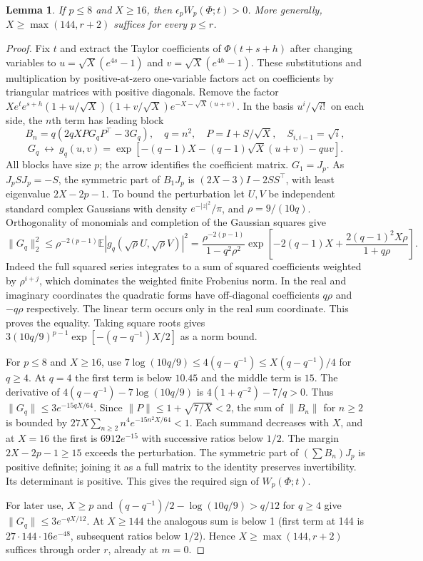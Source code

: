 \documentclass[11pt,a4paper,reqno]{amsart}
\newtheorem{lemma}[theorem]{Lemma}
\numberwithin{equation}{section}
\begin{document}
\begin{lemma}\label{lem:tail}
If \(p\le8\) and \(X\ge16\), then \(\epsilon_p W_p(\Phi;t)>0\). More generally, \(X\ge\max(144,r+2)\) suffices for every \(p\le r\).
\end{lemma}


\begin{proof}
Fix \(t\) and extract the Taylor coefficients of \(\Phi(t+s+h)\) after changing variables to \(u=\sqrt X(e^{4s}-1)\) and \(v=\sqrt X(e^{4h}-1)\). These substitutions and multiplication by positive-at-zero one-variable factors act on coefficients by triangular matrices with positive diagonals. Remove the factor \(Xe^te^{s+h}(1+u/\sqrt X)(1+v/\sqrt X)e^{-X-\sqrt X(u+v)}\). In the basis \(u^i/\sqrt{i!}\) on each side, the \(n\)th term has leading block \[B_n=q(2qX PG_qP^\top-3G_q),\quad q=n^2,\quad P=I+S/\sqrt X,\quad S_{i,i-1}=\sqrt i,\] \[G_q\ \longleftrightarrow\ g_q(u,v)=\exp[-(q-1)X-(q-1)\sqrt X(u+v)-quv].\] All blocks have size \(p\); the arrow identifies the coefficient matrix. \(G_1=J_p\). As \(J_p S J_p=-S\), the symmetric part of \(B_1J_p\) is \((2X-3)I-2SS^\top\), with least eigenvalue \(2X-2p-1\). To bound the perturbation let \(U,V\) be independent standard complex Gaussians with density \(e^{-|z|^2}/\pi\), and \(\rho=9/(10q)\). Orthogonality of monomials and completion of the Gaussian squares give \[\|G_q\|_2^2\le \rho^{-2(p-1)}\mathbb E|g_q(\sqrt\rho U,\sqrt\rho V)|^2
 =\frac{\rho^{-2(p-1)}}{1-q^2\rho^2}
  \exp\left[-2(q-1)X+\frac{2(q-1)^2X\rho}{1+q\rho}\right].\] Indeed the full squared series integrates to a sum of squared coefficients weighted by \(\rho^{i+j}\), which dominates the weighted finite Frobenius norm. In the real and imaginary coordinates the quadratic forms have off-diagonal coefficients \(q\rho\) and \(-q\rho\) respectively. The linear term occurs only in the real sum coordinate. This proves the equality. Taking square roots gives \(3(10q/9)^{p-1}\exp[-(q-q^{-1})X/2]\) as a norm bound.

For \(p\le8\) and \(X\ge16\), use \(7\log(10q/9)\le4(q-q^{-1})\le X(q-q^{-1})/4\) for \(q\ge4\). At \(q=4\) the first term is below \(10.45\) and the middle term is \(15\). The derivative of \(4(q-q^{-1})-7\log(10q/9)\) is \(4(1+q^{-2})-7/q>0\). Thus \(\|G_q\|\le3e^{-15qX/64}\). Since \(\|P\|\le1+\sqrt{7/X}<2\), the sum of \(\|B_n\|\) for \(n\ge2\) is bounded by \(27X\sum_{n\ge2}n^4e^{-15n^2X/64}<1\). Each summand decreases with \(X\), and at \(X=16\) the first is \(6912e^{-15}\) with successive ratios below \(1/2\). The margin \(2X-2p-1\ge15\) exceeds the perturbation. The symmetric part of \((\sum B_n)J_p\) is positive definite; joining it as a full matrix to the identity preserves invertibility. Its determinant is positive. This gives the required sign of \(W_p(\Phi;t)\).

For later use, \(X\ge p\) and \((q-q^{-1})/2-\log(10q/9)>q/12\) for \(q\ge4\) give \(\|G_q\|\le3e^{-qX/12}\). At \(X\ge144\) the analogous sum is below 1 (first term at 144 is \(27\cdot144\cdot16e^{-48}\), subsequent ratios below \(1/2\)). Hence \(X\ge\max(144,r+2)\) suffices through order \(r\), already at \(m=0\).
\end{proof}
\end{document}

